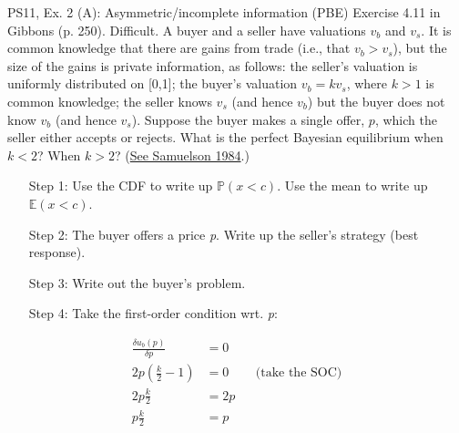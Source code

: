 \begin{frame}{PS11, Ex. 2 (A): Asymmetric/incomplete information (PBE)}
    Exercise 4.11 in Gibbons (p. 250). Difficult. A buyer and a seller have valuations $v_b$ and $v_s$. It is common knowledge that there are gains from trade (i.e., that $v_b > v_s$), but the size of the gains is private information, as follows: the seller’s valuation is uniformly distributed on [0,1]; the buyer’s valuation $v_b = kv_s$, where $k > 1$ is common knowledge; the seller knows $v_s$ (and hence $v_b$) but the buyer does not know $v_b$ (and hence $v_s$). Suppose the buyer makes a single offer, $p$, which the seller either accepts or rejects. What is the perfect Bayesian equilibrium when $k < 2$? When $k > 2$? (\href{https://www.jstor.org/stable/1911195}{See Samuelson 1984}.) \vspace{-8pt}
    \begin{multicols}{2}
      \begin{itemize}
        \item[Step 1:] Use the CDF to write up $\mathbb{P}(x<c)$. Use the mean to write up $\mathbb{E}(x<c)$.
        \item[Step 2:] The buyer offers a price \textit{p}. Write up the seller's strategy (best response).
        \item[Step 3:] Write out the buyer's problem.
        \item[Step 4:] Take the first-order condition wrt. \textit{p}:
      \end{itemize} \vspace{-8pt}
      \begin{align*}
        \frac{\delta u_b(p)}{\delta p}&=0\\
        2p\left(\frac{k}{2}-1\right)&=0&&\text{(take the SOC)}\\
        2p\frac{k}{2}&=2p\\
        p\frac{k}{2}&=p
      \end{align*}
      \vfill\null\columnbreak
\end{multicols}
\end{frame}
